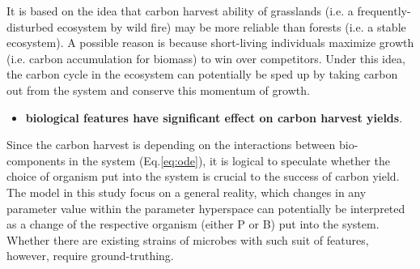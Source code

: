 \documentclass[../thesis.tex]{subfiles} %
\begin{document}
It is based on the idea that carbon harvest ability of grasslands (i.e. a frequently-disturbed ecosystem by wild fire) may be more reliable than forests (i.e. a stable ecosystem).\autocite{dass2018grasslands}  A possible reason is because short-living individuals maximize growth (i.e. carbon accumulation for biomass) to win over competitors.  Under this idea, the carbon cycle in the ecosystem can potentially be sped up by taking carbon out from the system and conserve this momentum of growth.

\begin{itemize}
    \item \textbf{biological features have significant effect on carbon harvest yields}.
\end{itemize}

Since the carbon harvest is depending on the interactions between bio-components in the system (Eq.\ref{eq:ode}), it is logical to speculate whether the choice of organism put into the system is crucial to the success of carbon yield.  The model in this study focus on a general reality, which changes in any parameter value within the parameter hyperspace can potentially be interpreted as a change of the respective organism (either P or B) put into the system.  Whether there are existing strains of microbes with such suit of features, however, require ground-truthing.
\end{document}
